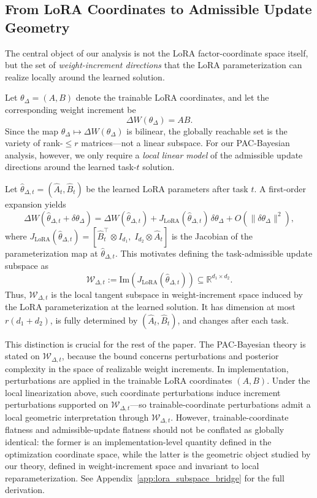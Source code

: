 \subsection{From LoRA Coordinates to Admissible Update Geometry}
\label{sec:lora-bridge}

The central object of our analysis is not the LoRA factor-coordinate space itself, but the set of \emph{weight-increment directions} that the LoRA parameterization can realize locally around the learned solution.

Let $\theta_{\Delta} = (A,B)$ denote the trainable LoRA coordinates, and let the corresponding weight increment be
\[
\Delta W(\theta_{\Delta}) = AB.
\]
Since the map $\theta_{\Delta} \mapsto \Delta W(\theta_{\Delta})$ is bilinear, the globally reachable set is the variety of rank-$\le r$ matrices---not a linear subspace.
For our PAC-Bayesian analysis, however, we only require a \emph{local linear model} of the admissible update directions around the learned task-$t$ solution.

Let $\hat{\theta}_{\Delta,t} = (\hat A_t, \hat B_t)$ be the learned LoRA parameters after task $t$.
A first-order expansion yields
\[
\Delta W(\hat{\theta}_{\Delta,t} + \delta\theta_{\Delta})
= \Delta W(\hat{\theta}_{\Delta,t})
+ J_{\mathrm{LoRA}}(\hat{\theta}_{\Delta,t})\,\delta\theta_{\Delta}
+ O(\|\delta\theta_{\Delta}\|^2),
\]
where $J_{\mathrm{LoRA}}(\hat{\theta}_{\Delta,t}) = [\hat B_t^\top \otimes I_{d_1},\; I_{d_2} \otimes \hat A_t]$ is the Jacobian of the parameterization map at $\hat\theta_{\Delta,t}$.
This motivates defining the task-admissible update subspace as
\[
\mathcal{W}_{\Delta,t}
:= \mathrm{Im}\!\left(J_{\mathrm{LoRA}}(\hat{\theta}_{\Delta,t})\right)
\subseteq \mathbb{R}^{d_1 \times d_2}.
\]
Thus, $\mathcal{W}_{\Delta,t}$ is the local tangent subspace in weight-increment space induced by the LoRA parameterization at the learned solution.
It has dimension at most $r(d_1 + d_2)$, is fully determined by $(\hat A_t, \hat B_t)$, and changes after each task.

This distinction is crucial for the rest of the paper.
The PAC-Bayesian theory is stated on $\mathcal{W}_{\Delta,t}$, because the bound concerns perturbations and posterior complexity in the space of realizable weight increments.
In implementation, perturbations are applied in the trainable LoRA coordinates $(A,B)$.
Under the local linearization above, such coordinate perturbations induce increment perturbations supported on $\mathcal{W}_{\Delta,t}$---so trainable-coordinate perturbations admit a local geometric interpretation through $\mathcal{W}_{\Delta,t}$.
However, trainable-coordinate flatness and admissible-update flatness should not be conflated as globally identical: the former is an implementation-level quantity defined in the optimization coordinate space, while the latter is the geometric object studied by our theory, defined in weight-increment space and invariant to local reparameterization.
See Appendix~\ref{app:lora_subspace_bridge} for the full derivation.

